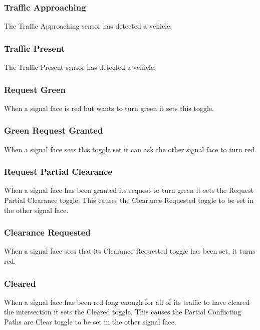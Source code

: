 \documentclass[letterpaper,twoside]{article}
\begin{document}
\subsubsection{Traffic Approaching}

The Traffic Approaching sensor has detected a vehicle.

\subsubsection{Traffic Present}

The Traffic Present sensor has detected a vehicle.

\subsubsection{Request Green}

When a signal face is red but wants to turn green it sets this toggle.

\subsubsection{Green Request Granted}

When a signal face sees this toggle set it can ask the other signal
face to turn red.

\subsubsection{Request Partial Clearance}

When a signal face has been granted its request to turn green it sets
the Request Partial Clearance toggle.  This causes the Clearance Requested
toggle to be set in the other signal face.

\subsubsection{Clearance Requested}

When a signal face sees that its Clearance Requested toggle has been
set, it turns red.

\subsubsection{Cleared}

When a signal face has been red long enough for all of its traffic
to have cleared the intersection it sets the Cleared toggle.
This causes the Partial Conflicting Paths are Clear toggle to be set
in the other signal face.
\end{document}
